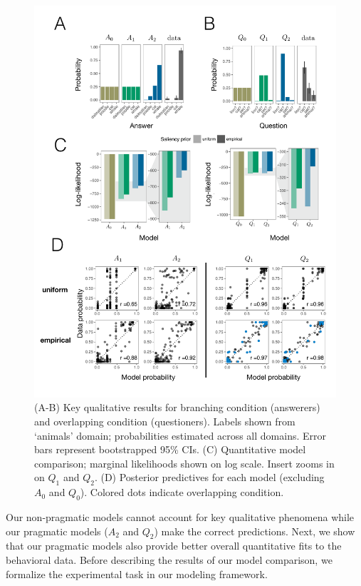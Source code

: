 \documentclass[12pt, floatsintext, jou]{apa6}
\begin{document}
\begin{figure}[tbh!]
\begin{center}
\includegraphics[scale = .77]{Exp1/ResultsFig.pdf}
\end{center}
\vspace{-2cm}
\caption{(A-B) Key qualitative results for branching condition (answerers) and overlapping condition (questioners). Labels shown from `animals' domain; probabilities estimated across all domains. Error bars represent bootstrapped 95\% CIs. (C) Quantitative model comparison; marginal likelihoods shown on log scale. Insert zooms in on $Q_1$ and $Q_2$. (D) Posterior predictives for each model (excluding $A_0$ and $Q_0$). Colored dots indicate overlapping condition.}
\label{fig:results}
\end{figure}

Our non-pragmatic models cannot account for key qualitative phenomena while our pragmatic models ($A_2$ and $Q_2$) make the correct predictions. Next, we show that our pragmatic models also provide better overall quantitative fits to the behavioral data. Before describing the results of our model comparison, we formalize the experimental task in our modeling framework. 
\end{document}
